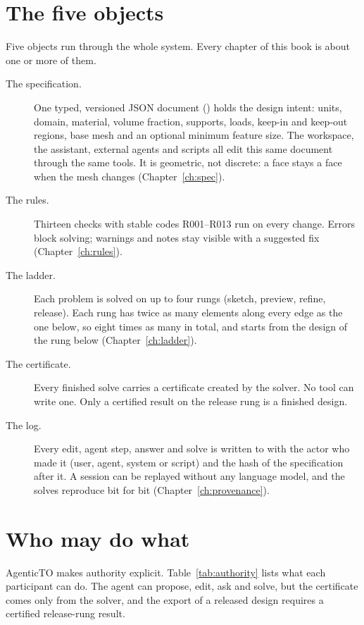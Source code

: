 \section{The five objects}\label{sec:fiveobjects}
Five objects run through the whole system. Every chapter of this book is about one or more of them.

\begin{description}
  \item[The specification.] One typed, versioned JSON document () holds the
  design intent: units, domain, material, volume fraction, supports, loads, keep-in and keep-out regions, base mesh
  and an optional minimum feature size. The workspace, the assistant, external agents and scripts all edit this same
  document through the same tools. It is geometric, not discrete: a face stays a face when the mesh changes
  (Chapter~\ref{ch:spec}).
  \item[The rules.] Thirteen checks with stable codes R001--R013 run on every change. Errors block
  solving; warnings and notes stay visible with a suggested fix (Chapter~\ref{ch:rules}).
  \item[The ladder.] Each problem is solved on up to four rungs (sketch, preview, refine,
  release). Each rung has twice as many elements along every edge as the one below, so eight times as many in total, and
  starts from the design of the rung below (Chapter~\ref{ch:ladder}).
  \item[The certificate.] Every finished solve carries a certificate created by the solver. No tool
  can write one. Only a certified result on the release rung is a finished design.
  \item[The log.] Every edit, agent step, answer and solve is written to  with
  the actor who made it (user, agent, system or script) and the hash of the specification after it. A session can be
  replayed without any language model, and the solves reproduce bit for bit (Chapter~\ref{ch:provenance}).
\end{description}

\section{Who may do what}\label{sec:authority}
AgenticTO makes authority explicit. Table~\ref{tab:authority} lists what each participant can do. The agent can
propose, edit, ask and solve, but the certificate comes only from the solver, and the export of a released design
requires a certified release-rung result.

